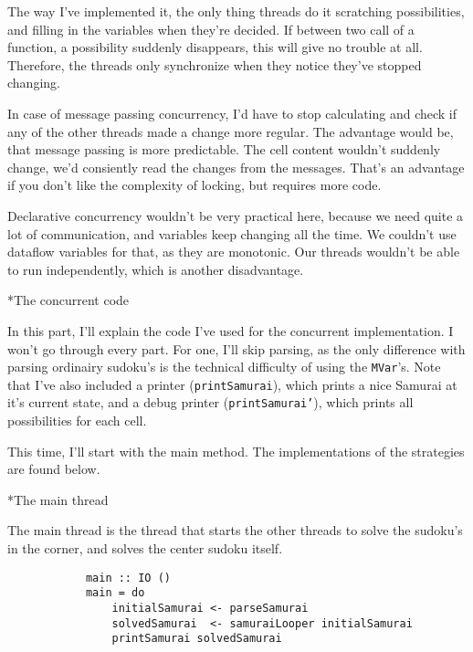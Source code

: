 \documentclass[a4paper,12pt]{article}
\begin{document}
\begin{section}
\begin{subsection}
        The way I've implemented it, the only thing threads do it scratching
        possibilities, and filling in the variables when they're decided. If
        between two call of a function, a possibility suddenly disappears, this
        will give no trouble at all. Therefore, the threads only synchronize
        when they notice they've stopped changing.

        In case of message passing concurrency, I'd have to stop calculating and
        check if any of the other threads made a change more regular. The
        advantage would be, that message passing is more predictable. The cell
        content wouldn't suddenly change, we'd consiently read the changes from
        the messages. That's an advantage if you don't like the complexity of
        locking, but requires more code.

        Declarative concurrency wouldn't be very practical here, because we need
        quite a lot of communication, and variables keep changing all the time.
        We couldn't use dataflow variables for that, as they are monotonic. Our
        threads wouldn't be able to run independently, which is another
        disadvantage.

    \end{subsection}


    \begin{subsection}*{The concurrent code}

        In this part, I'll explain the code I've used for the concurrent
        implementation. I won't go through every part. For one, I'll skip
        parsing, as the only difference with parsing ordinairy sudoku's is the
        technical difficulty of using the \texttt{MVar}'s. Note that I've also
        included a printer (\texttt{printSamurai}), which prints a nice Samurai
        at it's current state, and a debug printer (\texttt{printSamurai'}),
        which prints all possibilities for each cell.

        This time, I'll start with the main method. The implementations of the
        strategies are found below.

        \begin{subsubsection}*{The main thread}

            The main thread is the thread that starts the other threads to solve
            the sudoku's in the corner, and solves the center sudoku itself.

            \begin{lstlisting}
            main :: IO ()
            main = do
                initialSamurai <- parseSamurai
                solvedSamurai  <- samuraiLooper initialSamurai
                printSamurai solvedSamurai
            \end{lstlisting}


\end{subsubsection}
\end{subsection}
\end{section}
\end{document}

